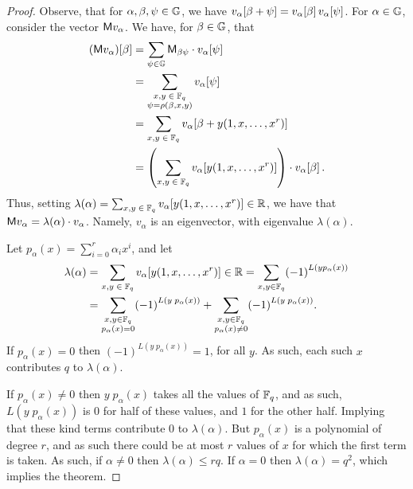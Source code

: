 \begin{proof}
    Observe, that for $\alpha,\beta,\psi \in \mathbb{G}$, we have
    $v_\alpha\!\left[\beta + \psi\right] =v_\alpha\!\left[\beta\right]
    v_\alpha\!\left[\psi\right]$. For $\alpha \in \mathbb{G}$, consider the
    vector $\mathsf{M} v_\alpha$. We have, for $\beta \in \mathbb{G}$, that
    \begin{align*}
        \Entry{\pth{\Mtrx v_\alpha}}{\beta} &= \sum_{\psi \in \LSpace}
        \Mtrx_{\beta \psi} \cdot \Entry{v_\alpha}{\psi} %
        \\&=%
        \sum_{\substack{x,y\; \in\; \Field_q\\ \psi =\rho(\beta,x,y)}}
        \Entry{v_\alpha}{\psi} \\&=%
        \sum_{x,y\; \in\; \Field_q}
        \Entry{v_\alpha}{\beta+ y(1,x,\ldots, x^r)}\\
        &=%
        \pth{\sum_{x,y\; \in\; \Field_q}
           \Entry{v_\alpha}{y(1,x,\ldots, x^r)}} \cdot
        \Entry{v_\alpha}{\beta}.
    \end{align*}
    Thus, setting $\lambda(\alpha) = \sum_{x,y\; \in\; \mathbb{F}_q}
    v_\alpha\!\left[y(1,x,\ldots, x^r)\right] \in \mathbb{R}$, we have that $\mathsf{M}
    v_\alpha = \lambda(\alpha) \cdot v_\alpha$. Namely, $v_\alpha$ is
    an eigenvector, with eigenvalue $\lambda(\alpha)$.

    Let $p_\alpha(x) =\sum_{i=0}^r \alpha_i x^i$, and let
    \begin{align*}
         \lambda(\alpha)&= \sum_{x,y\; \in\; \Field_q}
        \Entry{v_\alpha}{y(1,x,\ldots, x^r)} \in \Re %
        = \sum_{x,y \in \Field_q} \pth{-1}^{L(y p_\alpha(x))}\\ %
        &= \sum_{\substack{x,y \in \Field_q\\p_\alpha(x)=0}}
        \pth{-1}^{L(y\; p_\alpha(x))} %
        + \sum_{\substack{x,y \in \Field_q\\p_\alpha(x)\ne 0}}
        \pth{-1}^{L(y\; p_\alpha(x))} .
    \end{align*}
    If $p_\alpha(x) = 0$ then $(-1)^{L(y\;p_\alpha(x))} = 1$, for all
    $y$. As such, each such $x$ contributes $q$ to $\lambda(\alpha)$.

    If $p_\alpha(x) \ne 0$ then $y\;p_\alpha(x)$ takes all the values
    of $\mathbb{F}_q$, and as such, $L(y\;p_\alpha(x))$ is $0$ for half of
    these values, and $1$ for the other half. Implying that these kind
    terms contribute $0$ to $\lambda(\alpha)$. But $p_\alpha(x)$ is a
    polynomial of degree $r$, and as such there could be at most $r$
    values of $x$ for which the first term is taken. As such, if
    $\alpha \ne 0$ then $\lambda(\alpha) \leq rq$. If $\alpha = 0$
    then $\lambda(\alpha)=q^2$, which implies the theorem.
\end{proof}


